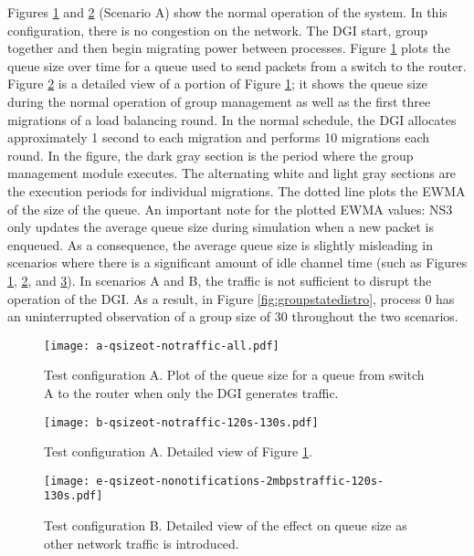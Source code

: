 Figures \ref{fig:plota} and \ref{fig:plotb} (Scenario A) show the normal operation of the system.
In this configuration, there is no congestion on the network. 
The \ac{DGI} start, group together and then begin migrating power between processes.
Figure \ref{fig:plota} plots the queue size over time for a queue used to send packets from a switch to the router.
Figure \ref{fig:plotb} is a detailed view of a portion of Figure \ref{fig:plota};
it shows the queue size during the normal operation of group management as well as the first three migrations of a load balancing round.
In the normal schedule, the DGI allocates approximately 1 second to each migration and performs 10 migrations each round.
In the figure, the dark gray section is the period where the group management module executes.
The alternating white and light gray sections are the execution periods for individual migrations.
The dotted line plots the \ac{EWMA} of the size of the queue.
An important note for the plotted \ac{EWMA} values: \ac{NS3} only updates the average queue size during simulation when a new packet is enqueued.
As a consequence, the average queue size is slightly misleading in scenarios where there is a significant amount of idle channel time (such as Figures \ref{fig:plota}, \ref{fig:plotb}, and \ref{fig:plote}).
In scenarios A and B, the traffic is not sufficient to disrupt the operation of the DGI.
As a result, in Figure \ref{fig:groupstatedistro}, process 0 has an uninterrupted observation of a group size of 30 throughout the two scenarios.

\begin{figure}
\centering
\texttt{[image: a-qsizeot-notraffic-all.pdf]}
\caption{Test configuration A. Plot of the queue size for a queue from switch A to the router when only the DGI generates traffic.}
\label{fig:plota}
\end{figure}

\begin{figure}
\centering
\texttt{[image: b-qsizeot-notraffic-120s-130s.pdf]}
\caption{Test configuration A. Detailed view of Figure \ref{fig:plota}.}
\label{fig:plotb}
\end{figure}

\begin{figure}
\centering
\texttt{[image: e-qsizeot-nonotifications-2mbpstraffic-120s-130s.pdf]}
\caption{Test configuration B. Detailed view of the effect on queue size as other network traffic is introduced.}
\label{fig:plote}
\end{figure}



